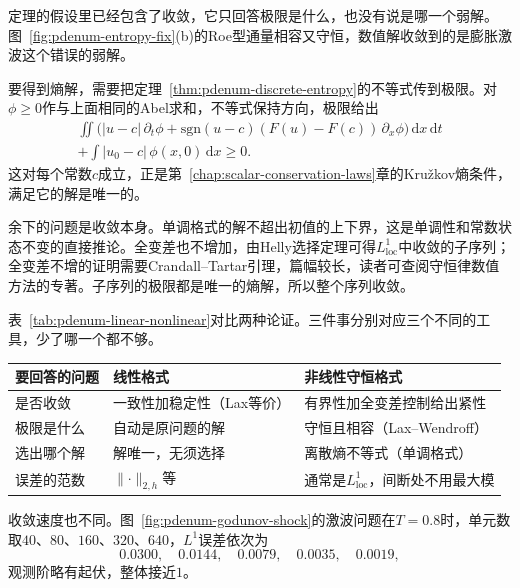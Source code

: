 定理的假设里已经包含了收敛，它只回答极限是什么，也没有说是哪一个弱解。图~\ref{fig:pdenum-entropy-fix}(b)的Roe型通量相容又守恒，数值解收敛到的是膨胀激波这个错误的弱解。

要得到熵解，需要把定理~\ref{thm:pdenum-discrete-entropy}的不等式传到极限。对$\phi\geq0$作与上面相同的Abel求和，不等式保持方向，极限给出
\begin{equation}
 \begin{gathered}
 \iint\bigl(\lvert u-c\rvert\,\partial_t\phi+\mathrm{sgn}(u-c)(F(u)-F(c))\,\partial_x\phi\bigr)\,\mathrm{d}x\,\mathrm{d}t\\
 +\int\lvert u_0-c\rvert\,\phi(x,0)\,\mathrm{d}x\geq0 .
 \end{gathered}
 \label{eq:pdenum-entropy-limit}
\end{equation}
这对每个常数$c$成立，正是第~\ref{chap:scalar-conservation-laws}章的Kružkov熵条件，满足它的解是唯一的。

余下的问题是收敛本身。单调格式的解不超出初值的上下界，这是单调性和常数状态不变的直接推论。全变差也不增加，由Helly选择定理可得$L^1_{\mathrm{loc}}$中收敛的子序列；全变差不增的证明需要Crandall--Tartar引理，篇幅较长，读者可查阅守恒律数值方法的专著。子序列的极限都是唯一的熵解，所以整个序列收敛。

表~\ref{tab:pdenum-linear-nonlinear}对比两种论证。三件事分别对应三个不同的工具，少了哪一个都不够。

\begin{BookInlineTable}
 \centering
 \caption{线性问题与非线性守恒律的收敛论证。}
 \label{tab:pdenum-linear-nonlinear}
 \begin{tabular}{p{20mm}p{34mm}p{40mm}}
  \toprule
  要回答的问题 & 线性格式 & 非线性守恒格式\\
  \midrule
  是否收敛 & 一致性加稳定性（Lax等价） & 有界性加全变差控制给出紧性\\
  极限是什么 & 自动是原问题的解 & 守恒且相容（Lax--Wendroff）\\
  选出哪个解 & 解唯一，无须选择 & 离散熵不等式（单调格式）\\
  误差的范数 & $\lVert\cdot\rVert_{2,h}$等 & 通常是$L^1_{\mathrm{loc}}$，间断处不用最大模\\
  \bottomrule
 \end{tabular}
\end{BookInlineTable}

收敛速度也不同。图~\ref{fig:pdenum-godunov-shock}的激波问题在$T=0.8$时，单元数取$40$、$80$、$160$、$320$、$640$，$L^1$误差依次为
\[
 0.0300,\quad 0.0144,\quad 0.0079,\quad 0.0035,\quad 0.0019,
\]
观测阶略有起伏，整体接近$1$。

